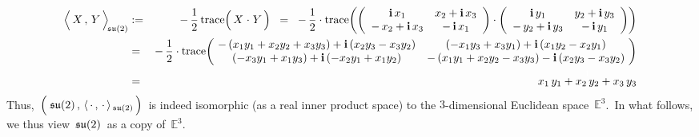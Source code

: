 \begin{eqnarray*}
\left\langle\,
	\overset{{\color{white}.}}{X}
	\, , \,
	Y
	\,\right\rangle_{\!\su(2)}
& := &
	-\,\dfrac{1}{2}\,
	\trace\!\left(\,X \overset{{\color{white}1}}{\cdot} Y\,\right)
\;\; = \;\;
	-\,\dfrac{1}{2}\cdot\trace\!\left(
		\left(\begin{array}{cc}
			\i\,x_{1} & x_{2} + \i\,x_{3}
			\\
			- \, x_{2} + \i\,x_{3} & -\,\i\,x_{1}
			\end{array}\right)
		\cdot
		\left(\begin{array}{cc}
			\i\,y_{1} & y_{2} + \i\,y_{3}
			\\
			- \, y_{2} + \i\,y_{3} & -\,\i\,y_{1}
			\end{array}\right)
		\right)
\\
& = &
	-\,\dfrac{1}{2}\cdot\trace\!\left(\!
		\begin{array}{cc}
			-\,(x_{1}y_{1} + x_{2}y_{2} + x_{3}y_{3}) + \i\,(x_{2}y_{3}-x_{3}y_{2}) & (-x_{1}y_{3}+x_{3}y_{1}) + \i\,(x_{1}y_{2} - x_{2}y_{1})
			\\
			(-x_{3}y_{1}+x_{1}y_{3}) + \i\,(-x_{2}y_{1}+x_{1}y_{2}) & -\,(x_{1}y_{1} + x_{2}y_{2} - x_{3}y_{3}) - \i\,(x_{2}y_{3}-x_{3}y_{2})
			\end{array}
		\!\right)
\\
& = &
	\overset{{\color{white}1}}{x_{1}\,y_{1} + x_{2}\,y_{2} + x_{3}\,y_{3}}
\end{eqnarray*}
Thus,
\,$\left(\;\overset{{\color{white}.}}{\su(2)}\,,\,\langle\,\cdot\,,\,\cdot\,\rangle_{\,\su(2)}\,\right)$\,
is indeed isomorphic (as a real inner product space) to the $3$-dimensional Euclidean space \,$\mathbb{E}^{3}$.\,
In what follows, we thus view \,$\mathfrak{su}(2)$\, as a copy of \,$\mathbb{E}^{3}$.\,

